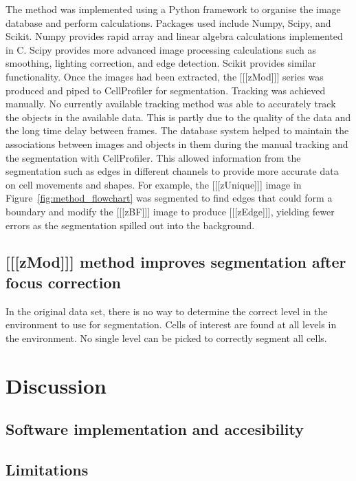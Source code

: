 \documentclass[preprint,11pt,5p,twocolumn]{elsarticle}
\begin{document}
The method was implemented using a Python framework to organise the image database and perform calculations. Packages used include Numpy, Scipy, and Scikit. Numpy provides rapid array and linear algebra calculations implemented in C. Scipy provides more advanced image processing calculations such as smoothing, lighting correction, and edge detection. Scikit provides similar functionality. Once the images had been extracted, the [[[zMod]]] series was produced and piped to CellProfiler for segmentation. Tracking was achieved manually. No currently available tracking method was able to accurately track the objects in the available data. This is partly due to the quality of the data and the long time delay between frames. The database system helped to maintain the associations between images and objects in them during the manual tracking and the segmentation with CellProfiler. This allowed information from the segmentation such as edges in different channels to provide more accurate data on cell movements and shapes. For example, the [[[zUnique]]] image in Figure~\ref{fig:method_flowchart} was segmented to find edges that could form a boundary and modify the [[[zBF]]] image to produce [[[zEdge]]], yielding fewer errors as the segmentation spilled out into the background.

\subsection{[[[zMod]]] method improves segmentation after focus correction}

In the original data set, there is no way to determine the correct level in the environment to use for segmentation. Cells of interest are found at all levels in the environment. No single level can be picked to correctly segment all cells.

\section{Discussion}

\subsection{Software implementation and accesibility}



\subsection{Limitations}
\end{document}
